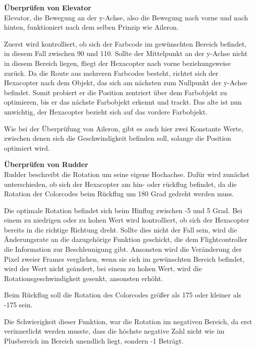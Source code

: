     \textbf{Überprüfen von Elevator}\\
    Elevator, die Bewegung an der y-Achse, also die Bewegung nach vorne und nach hinten, funktioniert nach dem selben Prinzip wie Aileron.

    Zuerst wird kontrolliert, ob sich der Farbcode im gewünschten Bereich befindet, in diesem Fall zwischen 90 und 110.
    Sollte der Mittelpunkt an der y-Achse nicht in diesem Bereich liegen, fliegt der Hexacopter nach vorne beziehungsweise zurück.
    Da die Route aus mehreren Farbcodes besteht, richtet sich der Hexacopter nach dem Objekt, das sich am nächsten zum Nullpunkt der y-Achse befindet. Somit probiert er die Position zentriert über dem Farbobjekt zu optimieren, bis er das nächste Farbobjekt erkennt und trackt. Das alte ist nun unwichtig, der Hexacopter bezieht sich auf das vordere Farbobjekt.

    Wie bei der Überprüfung von Aileron, gibt es auch hier zwei Konstante Werte, zwischen denen sich die Geschwindigkeit befinden soll, solange die Position optimiert wird.

    \textbf{Überprüfen von Rudder}\\
    Rudder beschreibt die Rotation um seine eigene Hochachse. Dafür wird zunächst unterschieden, ob sich der Hexacopter am hin- oder rückflug befindet, da die Rotation der Colorcodes beim Rückflug um 180 Grad gedreht werden muss.

    Die optimale Rotation befindet sich beim Hinflug zwischen -5 und 5 Grad.
    Bei einem zu niedrigen oder zu hohen Wert wird kontrolliert, ob sich der Hexacopter bereits in die richtige Richtung dreht.
    Sollte dies nicht der Fall sein, wird die Änderungsrate an die dazugehörige Funktion geschickt, die dem Flightcontroller die Information zur Beschleunigung gibt.
    Ansonsten wird die Veränderung der Pixel zweier Frames verglichen, wenn sie sich im gewünschten Bereich befindet, wird der Wert nicht geändert, bei einem zu hohen Wert, wird die Rotationsgeschwindigkeit gesenkt, ansonsten erhöht.

    Beim Rückflug soll die Rotation des Colorcodes größer als 175 oder kleiner als -175 sein.

    Die Schwierigkeit dieser Funktion, war die Rotation im negativen Bereich, da erst verinnerlicht werden musste, dass die höchste negative Zahl nicht wie im Plusbereich im Bereich unendlich liegt, sondern -1 Beträgt.


